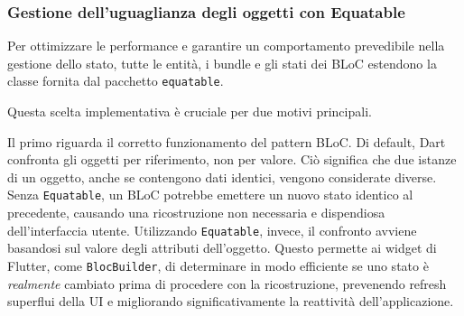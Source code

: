 
\subsubsection{Gestione dell'uguaglianza degli oggetti con Equatable}
Per ottimizzare le performance e garantire un comportamento prevedibile nella gestione dello stato, tutte le entità, i bundle e gli stati dei BLoC estendono la classe fornita dal pacchetto \texttt{equatable}.

Questa scelta implementativa è cruciale per due motivi principali.

Il primo riguarda il corretto funzionamento del pattern BLoC. Di default, Dart confronta gli oggetti per riferimento, non per valore.
Ciò significa che due istanze di un oggetto, anche se contengono dati identici, vengono considerate diverse.
Senza \texttt{Equatable}, un BLoC potrebbe emettere un nuovo stato identico al precedente, causando una ricostruzione non necessaria e dispendiosa dell'interfaccia utente.
Utilizzando \texttt{Equatable}, invece, il confronto avviene basandosi sul valore degli attributi dell'oggetto.
Questo permette ai widget di Flutter, come \texttt{BlocBuilder}, di determinare in modo efficiente se uno stato è \emph{realmente} cambiato prima di procedere con la ricostruzione, prevenendo refresh superflui della UI e migliorando significativamente la reattività dell'applicazione.

